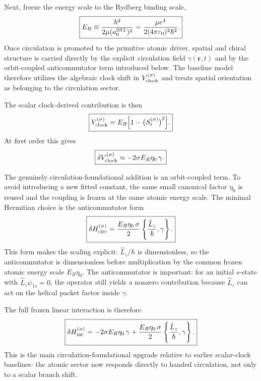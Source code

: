 \documentclass[11pt,a4paper]{article}
\begin{document}
    Next, freeze the energy scale to the Rydberg binding scale,
    \begin{equation}
        \label{eq:ERfreeze}
        \boxed{
            E_R \equiv \frac{\hbar^2}{2\mu (a_0^{\rm SST})^2}
            = \frac{\mu e^4}{2(4\pi\varepsilon_0)^2\hbar^2}.
        }
    \end{equation}
    Once circulation is promoted to the primitive atomic driver, spatial and chiral structure is carried directly by the explicit circulation field $\gamma(\mathbf r,t)$ and by the orbit-coupled anticommutator term introduced below. The baseline model therefore utilizes the algebraic clock shift in $V_{\rm clock}^{(\sigma)}$ and treats spatial orientation as belonging to the circulation sector.
    
    The scalar clock-derived contribution is then
    \begin{equation}
        \label{eq:Vclock}
        \boxed{
            V_{\rm clock}^{(\sigma)}
            =
            E_R\Bigl[1-\bigl(S_t^{(\sigma)}\bigr)^2\Bigr].
        }
    \end{equation}
    At first order this gives
    \begin{equation}
        \label{eq:Vclock-linear}
        \boxed{
            \delta V_{\rm clock}^{(\sigma)}
            \approx
            -2\sigma E_R\eta_0\,\gamma.
        }
    \end{equation}
    
    The genuinely circulation-foundational addition is an orbit-coupled term. To avoid introducing a new fitted constant, the same small canonical factor $\eta_0$ is reused and the coupling is frozen at the same atomic energy scale. The minimal Hermitian choice is the anticommutator form
    \begin{equation}
        \label{eq:HintCirc}
        \boxed{
            \delta H_{\rm circ}^{(\sigma)}
            =
            \frac{E_R\eta_0\,\sigma}{2}
            \left\{\frac{\hat L_z}{\hbar},\gamma\right\}.
        }
    \end{equation}
    This form makes the scaling explicit: $\hat L_z/\hbar$ is dimensionless, so the anticommutator is dimensionless before multiplication by the common frozen atomic energy scale $E_R\eta_0$. The anticommutator is important: for an initial $s$-state with $\hat L_z\psi_{1s}=0$, the operator still yields a nonzero contribution because $\hat L_z$ can act on the helical packet factor inside $\gamma$.
    
    The full frozen linear interaction is therefore
    \begin{equation}
        \label{eq:HintTotal}
        \boxed{
            \delta H_{\rm int}^{(\sigma)}
            =
            -2\sigma E_R\eta_0\,\gamma
            +
            \frac{E_R\eta_0\,\sigma}{2}
            \left\{\frac{\hat L_z}{\hbar},\gamma\right\}.
        }
    \end{equation}
    This is the main circulation-foundational upgrade relative to earlier scalar-clock baselines: the atomic sector now responds directly to handed circulation, not only to a scalar branch shift.
    
\end{document}
